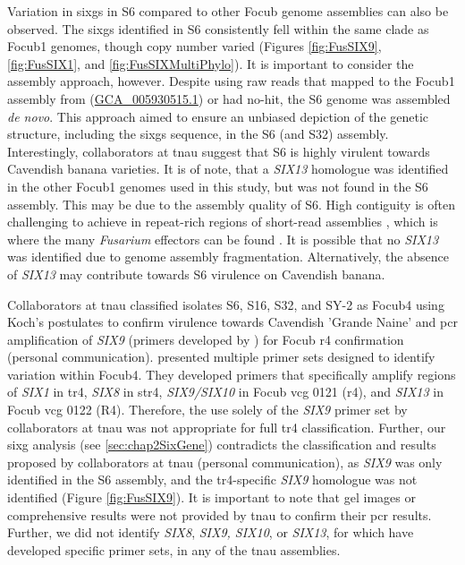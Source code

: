 Variation in \acp{sixg} in S6 compared to other \ac{Focub} genome assemblies can also be observed. The \acp{sixg} identified in S6 consistently fell within the same clade as \ac{Focub1} genomes, though copy number varied (Figures \ref{fig:FusSIX9}, \ref{fig:FusSIX1}, and \ref{fig:FusSIXMultiPhylo}). It is important to consider the assembly approach, however. Despite using raw reads that mapped to the \ac{Focub1} assembly from \textcite{Asai2019} (\href{https://www.ncbi.nlm.nih.gov/datasets/genome/GCA_005930515.1/}{GCA\_005930515.1}) or had no-hit, the S6 genome was assembled \textit{de novo}. This approach aimed to ensure an unbiased depiction of the genetic structure, including the \acp{sixg} sequence, in the S6 (and S32) assembly. Interestingly, collaborators at \ac{tnau} suggest that S6 is highly virulent towards Cavendish banana varieties. It is of note, that a \textit{SIX13} homologue was identified in the other \ac{Focub1} genomes used in this study, but was not found in the S6 assembly.  This may be due to the assembly quality of S6. High contiguity is often challenging to achieve in repeat-rich regions of short-read assemblies \parencite{Treangen2012, Peona2021}, which is where the many \textit{Fusarium} effectors can be found \parencite{Ma2010, Schmidt2013, Armitage2018}. It is possible that no \textit{SIX13} was identified due to genome assembly fragmentation. Alternatively, the absence of \textit{SIX13} may contribute towards S6 virulence on Cavendish banana. 

Collaborators at \ac{tnau} classified isolates S6, S16, S32, and SY-2 as \ac{Focub4} using Koch's postulates to confirm virulence towards Cavendish  'Grande Naine' and \ac{pcr} amplification of \textit{SIX9} (primers developed by \textcite{Carvalhais2019}) for \ac{Focub} \ac{r4} confirmation (personal communication). \textcite{Carvalhais2019} presented multiple primer sets designed to identify variation within \ac{Focub4}. They developed primers that specifically amplify regions of \textit{SIX1} in \ac{tr4}, \textit{SIX8} in \ac{str4}, \textit{SIX9/SIX10} in \ac{Focub} \ac{vcg} 0121 (\ac{r4}), and \textit{SIX13} in \ac{Focub} \ac{vcg} 0122 (R4). Therefore, the use solely of the \textit{SIX9} primer set by collaborators at \ac{tnau} was not appropriate for full \ac{tr4} classification. Further, our \ac{sixg} analysis (see \ref{sec:chap2SixGene}) contradicts the classification and results proposed by collaborators at \ac{tnau} (personal communication), as \textit{SIX9} was only identified in the S6 assembly, and the \ac{tr4}-specific \textit{SIX9} homologue was not identified (Figure \ref{fig:FusSIX9}). It is important to note that gel images or comprehensive results were not provided by \ac{tnau} to confirm their \ac{pcr} results. Further, we did not identify \textit{SIX8}, \textit{SIX9, SIX10}, or \textit{SIX13}, for which  \textcite{Carvalhais2019} have developed specific primer sets, in any of the \ac{tnau} assemblies. 

